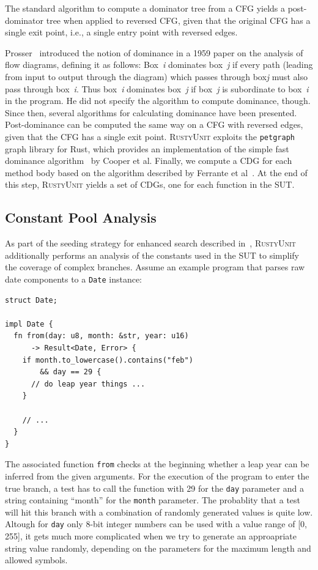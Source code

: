 \documentclass[paper=a4,%
  twoside,%
  BCOR4mm,%
  abstract=true,%
  toc=bibliography,%
  chapterprefix=true,%
  toc=bibliographynumbered,%
  open=right,%
  english,%
  pagesize=pdftex]{scrreprt}
\newcommand{\tech}{\textsc{RustyUnit}\xspace}
\newcommand{\cfg}{\ac{CFG}\xspace}
\newcommand{\cdgs}{\acp{CDG}\xspace}
\newcommand{\sut}{\ac{SUT}\xspace}
\begin{document}
The standard algorithm to compute a dominator tree from a \cfg yields a post-dominator tree when applied to reversed \cfg, given that the original \cfg has a single exit point, i.e., a single entry point with reversed edges.

Prosser~\cite{Prosser1959} introduced the notion of dominance in a 1959 paper on the analysis of flow diagrams, defining it as follows:
Box~\emph{i} dominates box~\emph{j} if every path (leading from input to output through the diagram) which passes through box\emph{j} must also pass through box~\emph{i}. Thus box~\emph{i} dominates box~\emph{j} if box~\emph{j} is subordinate to box~\emph{i} in the program. He did not specify the algorithm to compute dominance, though. Since then, several algorithms for calculating dominance have been presented. Post-dominance can be computed the same way on a \cfg with reversed edges, given that the \cfg has a single exit point. \tech exploits the \texttt{petgraph} graph library for Rust, which provides an implementation of the simple fast dominance algorithm~\cite{Cooper2001} by Cooper et al. Finally, we compute a \ac{CDG} for each method body based on the algorithm described by Ferrante et al~\cite{Ferrante1987}. At the end of this step, \tech yields a set of \cdgs, one for each function in the \sut.

\subsection{Constant Pool Analysis}
As part of the seeding strategy for enhanced search described in~, \tech additionally performs an analysis of the constants used in the \sut to simplify the coverage of complex branches. Assume an example program that parses raw date components to a \texttt{Date} instance:
\begin{lstlisting}[style=boxed, caption={},label=lst:mir-constant-analysis-example, escapechar=§]
struct Date;

impl Date {
  fn from(day: u8, month: &str, year: u16)
      -> Result<Date, Error> {
    if month.to_lowercase().contains("feb")
        && day == 29 {
      // do leap year things ...
    }

    // ...
  }
}
\end{lstlisting}

The associated function \texttt{from} checks at the beginning whether a leap year can be inferred from the given arguments. For the execution of the program to enter the true branch, a test has to call the function with 29 for the \texttt{day} parameter and a string containing ``month'' for the \texttt{month} parameter. The probablity that a test will hit this branch with a combination of randomly generated values is quite low. Altough for \texttt{day} only 8-bit integer numbers can be used with a value range of [0, 255], it gets much more complicated when we try to generate an approapriate string value randomly, depending on the parameters for the maximum length and allowed symbols.
\end{document}
